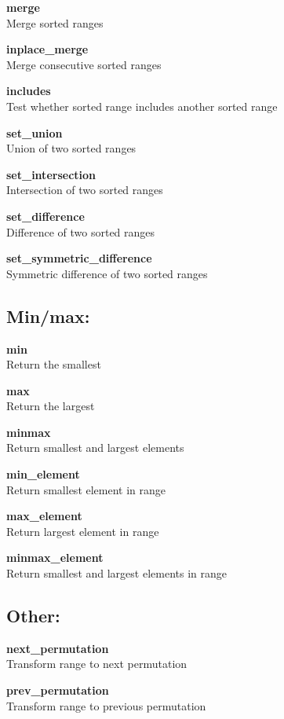 \documentclass[table]{article}
\begin{document}
\begin{multicols}{2}
	\textbf{merge}\\
	Merge sorted ranges
	
	\textbf{inplace\_merge}\\
	Merge consecutive sorted ranges
	
	\textbf{includes}\\
	Test whether sorted range includes another sorted range
	
	\textbf{set\_union}\\
	Union of two sorted ranges
	
	\textbf{set\_intersection}\\
	Intersection of two sorted ranges
	
	\textbf{set\_difference}\\
	Difference of two sorted ranges
	
	\textbf{set\_symmetric\_difference}\\
	Symmetric difference of two sorted ranges
	
	\subsection*{Min/max:}
	
	\textbf{min}\\
	Return the smallest
	
	\textbf{max}\\
	Return the largest
	
	\textbf{minmax}\\
	Return smallest and largest elements
	
	\textbf{min\_element}\\
	Return smallest element in range
	
	\textbf{max\_element}\\
	Return largest element in range
	
	\textbf{minmax\_element}\\
	Return smallest and largest elements in range
	
	\subsection*{Other:}
	
	\textbf{next\_permutation}\\
	Transform range to next permutation
	
	\textbf{prev\_permutation}\\
	Transform range to previous permutation
	
	\end{multicols}
\end{document}
